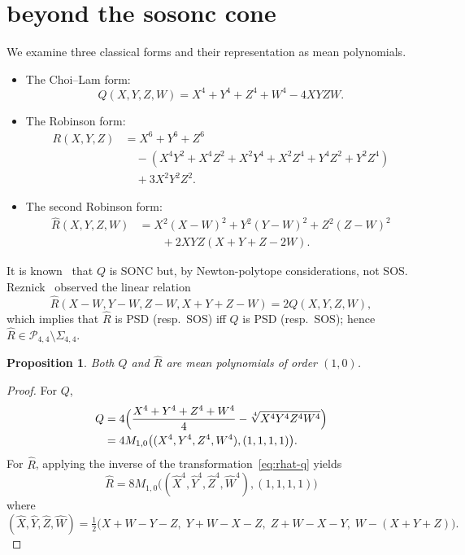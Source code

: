 \documentclass{amsart}
\newtheorem{prop}[thm]{Proposition}
\theoremstyle{definition}
\numberwithin{equation}{section}
\begin{document}
\section{beyond the sosonc cone}\label{sec:beyond}

We examine three classical forms and their representation as mean
polynomials.

\begin{itemize}
  \item The Choi--Lam form:
  \[
  Q(X,Y,Z,W)=X^4+Y^4+Z^4+W^4-4XYZW.
  \]
  \item The Robinson form:
  \begin{align*}
  R(X,Y,Z)&=X^6+Y^6+Z^6\\
  &\quad-(X^4Y^2+X^4Z^2+X^2Y^4+X^2Z^4+Y^4Z^2+Y^2Z^4)\\
  &\quad+3X^2Y^2Z^2.
  \end{align*}
  \item The second Robinson form:
  \begin{align*}
  \hat{R}(X,Y,Z,W)&=X^2(X-W)^2+Y^2(Y-W)^2+Z^2(Z-W)^2\\
  &\qquad+2XYZ(X+Y+Z-2W).
  \end{align*}
\end{itemize}

It is known~\cite{MSc01} that $Q$ is SONC but, by Newton-polytope
considerations, not SOS.  Reznick~\cite{Rez07} observed the linear relation
\begin{equation}\label{eq:rhat-q}
\hat{R}(X-W,Y-W,Z-W,X+Y+Z-W)=2Q(X,Y,Z,W),
\end{equation}
which implies that $\hat{R}$ is PSD (resp.\ SOS) iff $Q$ is PSD (resp.\ SOS);
hence $\hat{R}\in\mathcal{P}_{4,4}\setminus\Sigma_{4,4}$.

\begin{prop}\label{prop:cl-rob}
Both $Q$ and $\hat{R}$ are mean polynomials of order $(1,0)$.
\end{prop}

\begin{proof}
For $Q$,
\begin{align*}
Q&=4\Bigl(\frac{X^4+Y^4+Z^4+W^4}{4}-\sqrt[4]{X^4Y^4Z^4W^4}\Bigr)\\
&=4M_{1,0}\bigl((X^4,Y^4,Z^4,W^4),(1,1,1,1)\bigr).
\end{align*}
For $\hat{R}$, applying the inverse of the transformation~\eqref{eq:rhat-q}
yields
\[
\hat{R}=8M_{1,0}\bigl((\hat{X}^4,\hat{Y}^4,\hat{Z}^4,\hat{W}^4),(1,1,1,1)\bigr)
\]
where
\[
(\hat{X},\hat{Y},\hat{Z},\hat{W})=\tfrac12\bigl(
X+W-Y-Z,\;Y+W-X-Z,\;Z+W-X-Y,\;W-(X+Y+Z)\bigr).
\]
\end{proof}
\end{document}

